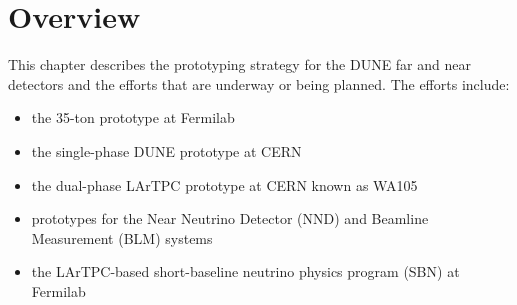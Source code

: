 \section{Overview}
\label{sec:proto-overview}


This chapter describes the prototyping strategy for the DUNE  far and near detectors and the efforts that are underway or being planned.  The efforts include:
\begin{itemize}
\item the 35-ton prototype at Fermilab
\item the single-phase DUNE prototype at CERN
\item the dual-phase LArTPC prototype at CERN known as WA105
\item prototypes for the Near Neutrino Detector (NND) and Beamline Measurement (BLM) systems
\item the LArTPC-based short-baseline neutrino physics program (SBN) at Fermilab
\end{itemize}


